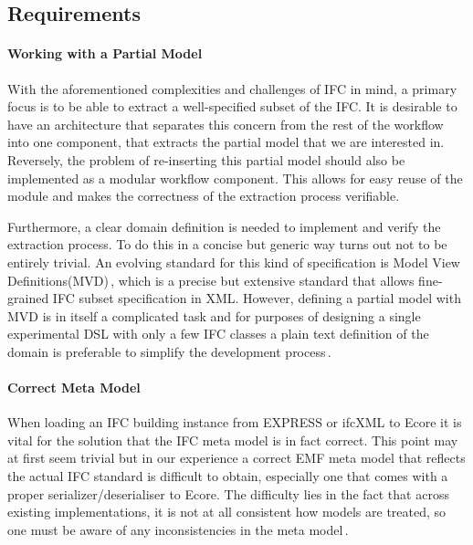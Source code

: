 \subsection{Requirements}
\paragraph{Working with a Partial Model}
With the aforementioned complexities and challenges of IFC in mind, a primary focus is to be able to extract a well-specified subset of the IFC. It is desirable to have an architecture that separates this concern from the rest of the workflow into one component, that extracts the partial model that we are interested in. Reversely, the problem of re-inserting this partial model should also be implemented as a modular workflow component. This allows for easy reuse of the module and makes the correctness of the extraction process verifiable.

Furthermore, a clear domain definition is needed to implement and verify the extraction process. To do this in a concise but generic way turns out not to be entirely trivial. An evolving standard for this kind of specification is Model View Definitions(MVD)\,\cite{nour08}, which is a precise but extensive standard that allows fine-grained IFC subset specification in XML. However, defining a partial model with MVD is in itself a complicated task and for purposes of designing a single experimental DSL with only a few IFC classes a plain text definition of the domain is preferable to simplify the development process\,\cite{mvd}.

\paragraph{Correct Meta Model}
When loading an IFC building instance from EXPRESS or ifcXML to Ecore it is vital for the solution that the IFC meta model is in fact correct. This point may at first seem trivial but in our experience a correct EMF meta model that reflects the actual IFC standard is difficult to obtain, especially one that comes with a proper serializer/deserialiser to Ecore. The difficulty lies in the fact that across existing implementations, it is not at all consistent how models are treated, so one must be aware of any inconsistencies in the meta model\,\cite[pp. 4]{quteprints37725}. %

